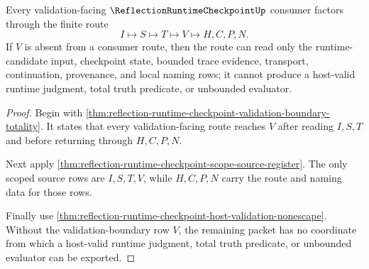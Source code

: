 \begin{theorem}
\label{thm:reflection-runtime-checkpoint-route-source-totality}
Every validation-facing $\ReflectionRuntimeCheckpointUp$ consumer factors through the finite route
$$
I \longmapsto S \longmapsto T \longmapsto V \longmapsto H,C,P,N.
$$
If $V$ is absent from a consumer route, then the route can read only the runtime-candidate input, checkpoint state, bounded trace evidence, transport, continuation, provenance, and local naming rows; it cannot produce a host-valid runtime judgment, total truth predicate, or unbounded evaluator.
\end{theorem}
\begin{proof}
Begin with \autoref{thm:reflection-runtime-checkpoint-validation-boundary-totality}. It states that every validation-facing route reaches $V$ after reading $I,S,T$ and before returning through $H,C,P,N$.

Next apply \autoref{thm:reflection-runtime-checkpoint-scope-source-register}. The only scoped source rows are $I,S,T,V$, while $H,C,P,N$ carry the route and naming data for those rows.

Finally use \autoref{thm:reflection-runtime-checkpoint-host-validation-nonescape}. Without the validation-boundary row $V$, the remaining packet has no coordinate from which a host-valid runtime judgment, total truth predicate, or unbounded evaluator can be exported.
\end{proof}

